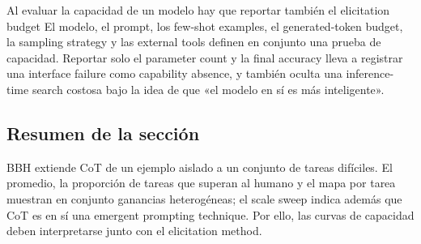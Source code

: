 \begin{importantbox}{Al evaluar la capacidad de un modelo hay que reportar también el elicitation budget}
El modelo, el prompt, los few-shot examples, el generated-token budget, la sampling strategy y las external tools definen en conjunto una prueba de capacidad. Reportar solo el parameter count y la final accuracy lleva a registrar una interface failure como capability absence, y también oculta una inference-time search costosa bajo la idea de que «el modelo en sí es más inteligente».
\end{importantbox}

\subsection{Resumen de la sección}

BBH extiende CoT de un ejemplo aislado a un conjunto de tareas difíciles. El promedio, la proporción de tareas que superan al humano y el mapa por tarea muestran en conjunto ganancias heterogéneas; el scale sweep indica además que CoT es en sí una emergent prompting technique. Por ello, las curvas de capacidad deben interpretarse junto con el elicitation method.

